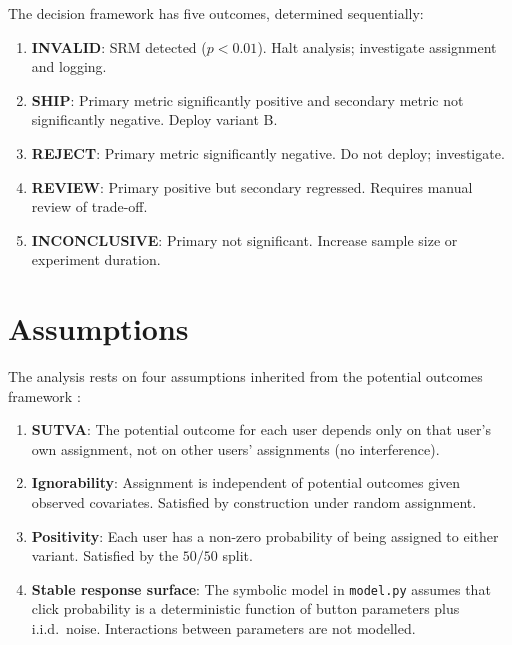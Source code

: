 \documentclass[a4paper,12pt]{extarticle}
\numberwithin{equation}{section}
\begin{document}
The decision framework has five outcomes, determined
sequentially:

\begin{enumerate}
    \item \textbf{INVALID}: SRM detected ($p < 0.01$).
          Halt analysis; investigate assignment and logging.
    \item \textbf{SHIP}: Primary metric significantly positive
          and secondary metric not significantly negative.
          Deploy variant B.
    \item \textbf{REJECT}: Primary metric significantly
          negative. Do not deploy; investigate.
    \item \textbf{REVIEW}: Primary positive but secondary
          regressed. Requires manual review of trade-off.
    \item \textbf{INCONCLUSIVE}: Primary not significant.
          Increase sample size or experiment duration.
\end{enumerate}

\section{Assumptions}

The analysis rests on four assumptions inherited from the
potential outcomes framework \cite{rubin1999teaching}:

\begin{enumerate}
    \item \textbf{SUTVA}: The potential outcome for each user
          depends only on that user's own assignment, not on
          other users' assignments (no interference).
    \item \textbf{Ignorability}: Assignment is independent of
          potential outcomes given observed covariates. Satisfied
          by construction under random assignment.
    \item \textbf{Positivity}: Each user has a non-zero
          probability of being assigned to either variant.
          Satisfied by the $50/50$ split.
    \item \textbf{Stable response surface}: The symbolic model
          in \texttt{model.py} assumes that click probability is
          a deterministic function of button parameters plus
          i.i.d.\ noise. Interactions between parameters are not
          modelled.
\end{enumerate}
\end{document}
